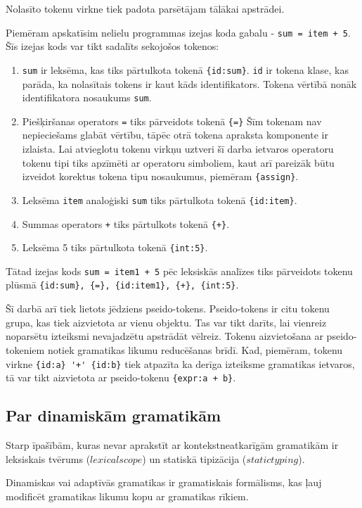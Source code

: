 Nolasīto tokenu virkne tiek padota parsētājam tālākai apstrādei.

Piemēram apskatīsim nelielu programmas izejas koda gabalu - \verb|sum = item + 5|. Šīs izejas kods var tikt sadalīts sekojošos tokenos:
\begin{enumerate}
\item \verb|sum| ir leksēma, kas tiks pārtulkota tokenā \verb|{id:sum}|. \verb|id| ir tokena klase, kas parāda, ka nolasītais tokens ir kaut kāds identifikators. Tokena vērtībā nonāk identifikatora nosaukums \verb|sum|.
\item Piešķiršanas operators \verb|=| tiks pārveidots tokenā \verb|{=}| Šīm tokenam nav nepieciešams glabāt vērtību, tāpēc otrā tokena apraksta komponente ir izlaista. Lai atvieglotu tokenu virkņu uztveri šī darba ietvaros operatoru tokenu tipi tiks apzīmēti ar operatoru simboliem, kaut arī pareizāk būtu izveidot korektus tokena tipu nosaukumus, piemēram \verb|{assign}|.
\item Leksēma \verb|item| analoģiski \verb|sum| tiks pārtulkota tokenā \verb|{id:item}|.
\item Summas operators \verb|+| tiks pārtulkots tokenā \verb|{+}|.
\item Leksēma 5 tiks pārtulkota tokenā \verb|{int:5}|.
\end{enumerate}

Tātad izejas kods \verb|sum = item1 + 5| pēc leksiskās analīzes tiks pārveidots tokenu plūsmā \verb|{id:sum}, {=}, {id:item1}, {+}, {int:5}|. \cite{DragonBook}

Šī darbā arī tiek lietots jēdziens pseido-tokens. Pseido-tokens ir citu tokenu grupa, kas tiek aizvietota ar vienu objektu. Tas var tikt darīts, lai vienreiz noparsētu izteiksmi nevajadzētu apstrādāt vēlreiz. Tokenu aizvietošana ar pseido-tokeniem notiek gramatikas likumu reducēšanas brīdī. Kad, piemēram, tokenu virkne \verb|{id:a} '+' {id:b}| tiek atpazīta ka derīga izteiksme gramatikas ietvaros, tā var tikt aizvietota ar pseido-tokenu \verb|{expr:a + b}|.

\subsection{\label{subsec:dynamicgrammars}Par dinamiskām gramatikām}

Starp īpašībām, kuras nevar aprakstīt ar kontekstneatkarīgām gramatikām ir leksiskais tvērums ($lexical scope$) un statiskā tipizācija ($static typing$).

Dinamiskas vai adaptīvās gramatikas ir gramatiskais formālisms, kas ļauj modificēt gramatikas likumu kopu ar gramatikas rīkiem. \cite{Shutt:AdaptiveGrammars}

